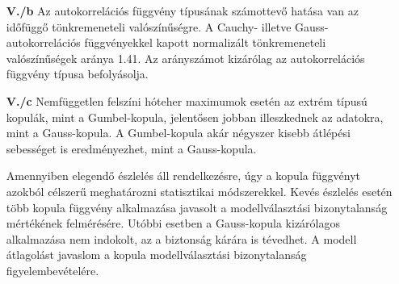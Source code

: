 \begin{otherlanguage}{hungarian}
\begin{enumerate}[leftmargin=*, align=left, labelwidth=*]
  \item[\textbf{V./b}] Az autokorrelációs függvény típusának számottevő hatása van az időfüggő tönkremeneteli valószínűségre. A Cauchy- illetve Gauss-autokorrelációs függvényekkel kapott normalizált tönkremeneteli valószínűségek aránya 1.41. Az arányszámot kizárólag az autokorrelációs függvény típusa befolyásolja.
  
  \item[\textbf{V./c}] Nemfüggetlen felszíni hóteher maximumok esetén az extrém típusú kopulák, mint a Gumbel-kopula, jelentősen jobban illeszkednek az adatokra, mint a Gauss-kopula. A Gumbel-kopula akár négyszer kisebb átlépési sebességet is eredményezhet, mint a Gauss-kopula.
  
  Amennyiben elegendő észlelés áll rendelkezésre, úgy a kopula függvényt azokból célszerű meghatározni statisztikai módszerekkel. Kevés észlelés esetén több kopula függvény alkalmazása javasolt a modellválasztási bizonytalanság mértékének felmérésére. Utóbbi esetben a Gauss-kopula kizárólagos alkalmazása nem indokolt, az a biztonság kárára is tévedhet. A modell átlagolást javaslom a kopula modellválasztási bizonytalanság figyelembevételére.
\end{enumerate}

\citep{RozsasSR2016}

\end{otherlanguage}